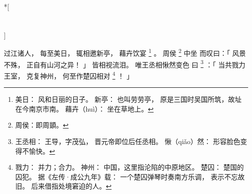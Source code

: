 
\switchcolumn[0]*[\section{}]

过江诸人，
每至美日，
辄相邀新亭，
藉卉饮宴%
\footnote{%
    美日：
        风和日丽的日子。
    新亭：
        也叫劳劳亭，
        原是三国时吴国所筑，故址在今南京市南。
    藉卉（huì）：
        坐在草地上。
}%
。
周侯%
\footnote{%
    周侯：即周顗。
}%
中坐
而叹曰：「
    风景不殊，
    正自有山河之异！
」
皆相视流泪。
唯王丞相愀然变色
曰%
\footnote{%
    王丞相：
        王导，字茂弘，
        晋元帝即位后任丞相。
    愀（qiǎo）然：
        形容脸色变得不愉快。
}%
：「
    当共戮力王室，
    克复神州，
    何至作楚囚相对%
    \footnote{%
        戮力：
            并力；合力。
        神州：
            中国，这里指沦陷的中原地区。
        楚囚：
            楚国的囚犯。
            据《左传·成公九年》载：
            一个楚囚弹琴时奏南方乐调，
            表示不忘故旧。
            后来借指处境窘迫的人。
    }%
    ！
」

\switchcolumn


